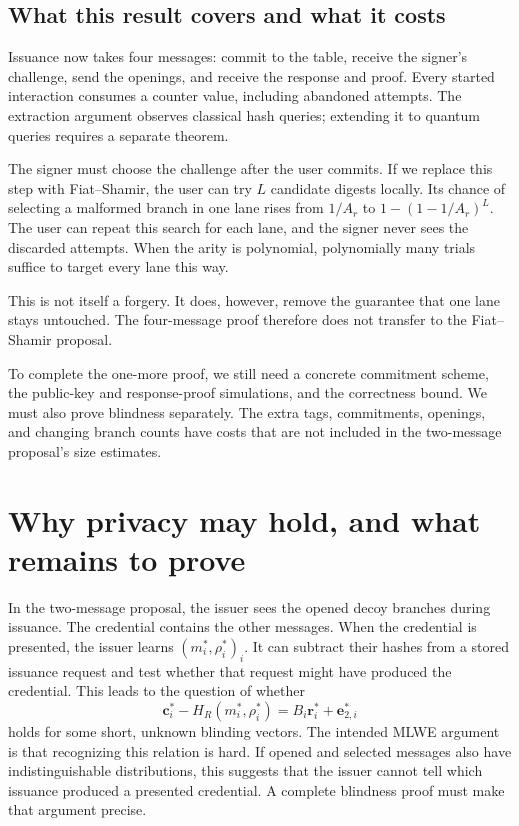 \documentclass[10pt]{article}
\begin{document}
\subsection{What this result covers and what it costs}

Issuance now takes four messages: commit to the table, receive the signer's
challenge, send the openings, and receive the response and proof.  Every
started interaction consumes a counter value, including abandoned attempts.
The extraction argument observes classical hash queries; extending it to
quantum queries requires a separate theorem.

The signer must choose the challenge after the user commits.  If we replace
this step with Fiat--Shamir, the user can try $L$ candidate digests locally.
Its chance of selecting a malformed branch in one lane rises from $1/A_r$
to $1-(1-1/A_r)^L$.  The user can repeat this search for each lane, and the
signer never sees the discarded attempts.  When the arity is polynomial,
polynomially many trials suffice to target every lane this way.

This is not itself a forgery.  It does, however, remove the guarantee that
one lane stays untouched.  The four-message proof therefore does not transfer
to the Fiat--Shamir proposal.

To complete the one-more proof, we still need a concrete commitment scheme,
the public-key and response-proof simulations, and the correctness bound.
We must also prove blindness separately.  The extra tags, commitments,
openings, and changing branch counts have costs that are not included in the
two-message proposal's size estimates.

\section{Why privacy may hold, and what remains to prove}

In the two-message proposal, the issuer sees the opened decoy branches during
issuance.  The credential contains the other messages.  When the credential
is presented, the issuer learns $(m_i^*,\rho_i^*)_i$.  It can subtract their
hashes from a stored issuance request and test whether that request might
have produced the credential.  This leads to the question of whether
\[
 \mathbf c_i^*-H_R(m_i^*,\rho_i^*)
   =B_i\mathbf r_i^*+\mathbf e_{2,i}^*
\]
holds for some short, unknown blinding vectors.  The intended MLWE argument
is that recognizing this relation is hard.  If opened and selected messages
also have indistinguishable distributions, this suggests that the issuer
cannot tell which issuance produced a presented credential.  A complete
blindness proof must make that argument precise.
\end{document}
